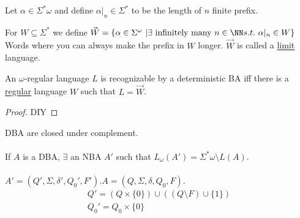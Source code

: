 \documentclass[../598comp.tex]{subfiles}
\begin{document}
Let $\alpha \in \Sigma^*\omega$ and define $\alpha|_n \in \Sigma^*$ to be the
length of $n$ finite prefix.
\begin{definition}
  For $W \subseteq \Sigma^*$ we define $\vec{W} = \{\alpha \in \Sigma^\omega \ |
  \exists \ \text{infinitely many} \ n \in \NN s.t. \ \alpha|_n \in W\}$
  Words where you can always make the prefix in $W$ longer. $\vec{W}$ is called
  a \ul{limit} language.
\end{definition}
\begin{theorem}
  An $\omega$-regular language $L$ is recognizable by a deterministic BA iff there
  is a \ul{regular} language $W$ such that $L = \vec{W}$.
  \begin{proof}
    DIY
  \end{proof}
\end{theorem}
\begin{theorem}
  DBA are closed under complement.
  \\\\
  If $A$ is a DBA, $\exists$ an NBA $A'$ such that $L_\omega(A') =
  \Sigma^*\omega \setminus L(A)$.
  \\\\
  $A' = (Q', \Sigma, \delta', Q_0', F'). A = (Q, \Sigma, \delta, Q_0, F)$. 
  \begin{gather*}
    Q' = (Q \times \{0\}) \cup ((Q \setminus F) \cup \{1\}) \\
    Q_0' = Q_0 \times \{0\} \\
  \end{gather*}
\end{theorem}
\end{document}
